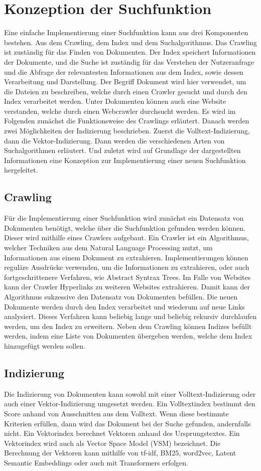 \chapter{Konzeption der Suchfunktion}
Eine einfache Implementierung einer Suchfunktion kann aus drei Komponenten bestehen.
Aus dem Crawling, dem Index und dem Suchalgorithmus.
Das Crawling ist zuständig für das Finden von Dokumenten\cite{Castillo_2005}.
Der Index speichert Informationen der Dokumente, und die Suche ist zuständig für das Verstehen der Nutzeranfrage und die Abfrage der relevantesten Informationen aus dem Index, sowie dessen Verarbeitung und Darstellung.
Der Begriff Dokument wird hier verwendet, um die Dateien zu beschreiben, welche durch einen Crawler gesucht und durch den Index verarbeitet werden.
Unter Dokumenten können auch eine Website verstanden, welche durch einen Webcrawler durchsucht werden.
Es wird im Folgenden zunächst die Funktionsweise des Crawlings erläutert.
Danach werden zwei Möglichkeiten der Indizierung beschrieben.
Zuerst die Volltext-Indizierung, dann die Vektor-Indizierung.
Dann werden die verschiedenen Arten von Suchalgorithmen erläutert.
Und zuletzt wird auf Grundlage der dargestellten Informationen eine Konzeption zur Implementierung einer neuen Suchfunktion hergeleitet.

\section{Crawling}
Für die Implementierung einer Suchfunktion wird zunächst ein Datensatz von Dokumenten benötigt, welche über die Suchfunktion gefunden werden können.
Dieser wird mithilfe eines Crawlers aufgebaut.
Ein Crawler ist ein Algorithmus, welcher Techniken aus dem Natural Language Processing nutzt, um Informationen aus einem Dokument zu extrahieren.\cite{Khder_2021}
Implementierungen können reguläre Ausdrücke verwenden, um die Informationen zu extrahieren, oder auch fortgeschrittenere Verfahren, wie Abstract Syntrax Trees.
Im Falle von Websites kann der Crawler Hyperlinks zu weiteren Websites extrahieren.
Damit kann der Algorithmus sukzessive den Datensatz von Dokumenten befüllen.
Die neuen Dokumente werden durch den Index verarbeitet und wiederum auf neue Links analysiert.
Dieses Verfahren kann beliebig lange und beliebig rekursiv durchlaufen werden, um den Index zu erweitern.
Neben dem Crawling können Indizes befüllt werden, indem eine Liste von Dokumenten übergeben werden, welche dem Index hinzugefügt werden sollen.

\section{Indizierung}
Die Indizierung von Dokumenten kann sowohl mit einer Volltext-Indizierung oder auch einer Vektor-Indizierung umgesetzt werden.
Ein Volltextindex bestimmt den Score anhand von Ausschnitten aus dem Volltext.
Wenn diese bestimmte Kriterien erfüllen, dann wird das Dokument bei der Suche gefunden, andernfalls nicht.
Ein Vektorindex berechnet Vektoren anhand des Ursprungstextes.
Ein Vektorindex wird auch als Vector Space Model (VSM) bezeichnet.
Die Berechnung der Vektoren kann mithilfe von tf-idf, BM25, word2vec, Latent Semantic Embeddings oder auch mit Transformers erfolgen.

